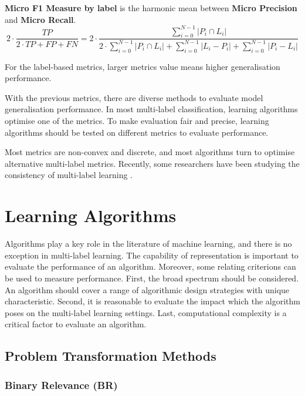 \textbf{Micro F1 Measure by label} is the harmonic mean between \textbf{Micro Precision} and \textbf{Micro Recall}. 
\begin{equation}\label{eq:LabelMicroAccuracy}
2 \cdot \frac{TP}{2 \cdot TP + FP + FN}=2 \cdot \frac{\sum_{i=0}^{N-1} \left|P_i \cap L_i\right|}{2 \cdot
        \sum_{i=0}^{N-1} \left|P_i \cap L_i\right| + \sum_{i=0}^{N-1} \left|L_i - P_i\right| + \sum_{i=0}^{N-1}
        \left|P_i - L_i\right|}
\end{equation}

For the label-based metrics, larger metrics value means higher generalisation performance.

With the previous metrics, there are diverse methods to evaluate model generalisation performance. In most multi-label classification, learning algorithms optimise one of the metrics. To make evaluation fair and precise, learning algorithms should be tested on different metrics to evaluate performance.

Most metrics are non-convex and discrete, and most algorithms turn to optimise alternative multi-label metrics. Recently, some researchers have been studying the consistency of multi-label learning \citep{gao2013consistency}. 

\section{Learning Algorithms}

Algorithms play a key role in the literature of machine learning, and there is no exception in multi-label learning. The capability of representation is important to evaluate the performance of an algorithm. Moreover, some relating criterions can be used to measure performance. First, the broad spectrum should be considered. An algorithm should cover a range of algorithmic design strategies with unique characteristic. Second, it is reasonable to evaluate the impact which the algorithm poses on the multi-label learning settings. Last, computational complexity is a critical factor to evaluate an algorithm.

\subsection{Problem Transformation Methods}

\subsubsection{Binary Relevance (BR)}

